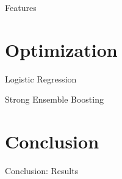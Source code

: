 \documentclass{beamer}
\begin{document}

\begin{frame}{Features}

\end{frame}


\section{Optimization}

\begin{frame}{Logistic Regression}

\end{frame}


\begin{frame}{Strong Ensemble Boosting}

\end{frame}


\section{Conclusion}
\begin{frame}{Conclusion: Results}

\end{frame}
\end{document}

